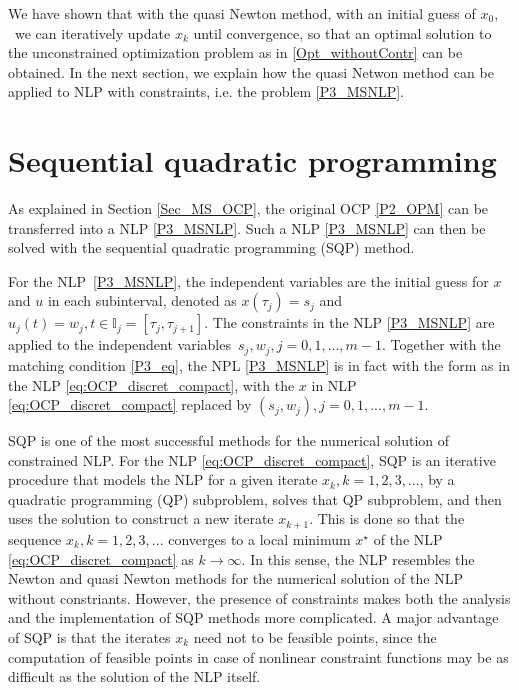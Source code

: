 \documentclass  [
  paper    = a4,
  BCOR     = 10mm,
  twoside,
  fontsize = 12pt,
  fleqn,
  toc      = bibnumbered,
  toc      = listofnumbered,
  numbers  = noendperiod,
  headings = normal,
  listof   = leveldown,
  version  = 3.03
]                                       {scrreprt}
\newcommand{\<}{\langle}
\renewcommand{\>}{\rangle}
\begin{document}
We have shown that with the quasi Newton method, with an initial guess of $x_0$,  we can iteratively update $x_k$ until convergence, so that an optimal solution to the unconstrained optimization problem as in \ref{Opt_withoutContr} can be obtained. In the next section, we explain how the quasi Netwon method can be applied to NLP with constraints, i.e. the problem \ref{P3_MSNLP}.



\section{Sequential quadratic programming}
\label{Section_SQP}
As explained in Section \ref{Sec_MS_OCP}, the original OCP \ref{P2_OPM} can be transferred into a NLP \ref{P3_MSNLP}. Such a NLP \ref{P3_MSNLP} can then be solved with the sequential quadratic programming (SQP) method. 


For the NLP \ref{P3_MSNLP}, the independent variables are the initial guess
for $x$ and $u$ in each subinterval, denoted as $x(\tau_j) = s_j$ and $u_j(t) = w_j, t \in \mathbb{I}_j = [\tau_j, \tau_{j+1}]$. The constraints in the NLP \ref{P3_MSNLP} are applied to the independent variables $s_j, w_j, j =0, 1, ..., m-1$. Together with the matching condition \ref{P3_eq}, the NPL \ref{P3_MSNLP} is in fact with the form as in the NLP \ref{eq:OCP_discret_compact}, with the $x$ in NLP \ref{eq:OCP_discret_compact} replaced by $(s_j, w_j), j =0, 1, ..., m-1$.

SQP is one of the most successful methods for the numerical solution of constrained NLP. For the NLP \ref{eq:OCP_discret_compact}, SQP is an iterative procedure that models the NLP for a given iterate $x_k, k =1, 2, 3, ...$, by a quadratic programming (QP) subproblem, solves that QP subproblem, and then uses the solution to construct a new iterate $x_{k+1}$. This is done so that the sequence $x_k, k =1, 2, 3,...$ converges to a local minimum $x^\star$ of the NLP  \ref{eq:OCP_discret_compact} as $k \rightarrow \infty$. In this sense, the NLP resembles the Newton and quasi Newton methods for the numerical solution of the NLP without constriants. However, the presence of constraints makes both the analysis and the implementation of SQP methods more complicated. A major advantage of SQP is that the iterates $x_k$ need not to be feasible points, since the computation of feasible points in case of nonlinear constraint functions may be as difficult as the solution of the NLP itself.
\end{document}
